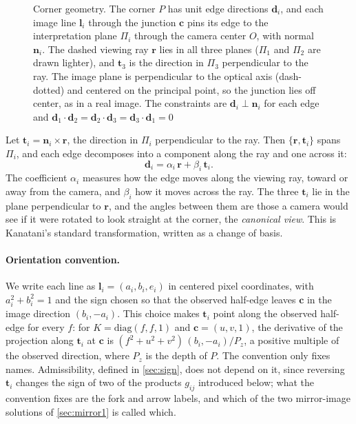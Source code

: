 \documentclass[pdflatex,sn-mathphys-num,iicol]{sn-jnl}
\newcommand{\vd}{\mathbf{d}}
\newcommand{\vr}{\mathbf{r}}
\newcommand{\vt}{\mathbf{t}}
\newcommand{\vn}{\mathbf{n}}
\newcommand{\vl}{\mathbf{l}}
\newcommand{\vc}{\mathbf{c}}
\theoremstyle{thmstyleone}
\theoremstyle{thmstylethree}
\theoremstyle{thmstyletwo}
\begin{document}
\begin{figure}[t]
\centering

\caption{Corner geometry. The corner $P$ has unit edge directions $\vd_i$, and each image line $\vl_i$ through the junction $\vc$ pins its edge to the interpretation plane $\Pi_i$ through the camera center $O$, with normal $\vn_i$. The dashed viewing ray $\vr$ lies in all three planes ($\Pi_1$ and $\Pi_2$ are drawn lighter), and $\vt_3$ is the direction in $\Pi_3$ perpendicular to the ray. The image plane is perpendicular to the optical axis (dash-dotted) and centered on the principal point, so the junction lies off center, as in a real image. The constraints are $\vd_i\perp\vn_i$ for each edge and $\vd_1\cdot\vd_2=\vd_2\cdot\vd_3=\vd_3\cdot\vd_1=0$}
\label{fig:geometry}
\end{figure}

Let $\vt_i=\vn_i\times\vr$, the direction in $\Pi_i$ perpendicular to the ray. Then $\{\vr,\vt_i\}$ spans $\Pi_i$, and each edge decomposes into a component along the ray and one across it:
\begin{equation}
\vd_i=\alpha_i\,\vr+\beta_i\,\vt_i .
\end{equation}
The coefficient $\alpha_i$ measures how the edge moves along the viewing ray, toward or away from the camera, and $\beta_i$ how it moves across the ray. The three $\vt_i$ lie in the plane perpendicular to $\vr$, and the angles between them are those a camera would see if it were rotated to look straight at the corner, the \emph{canonical view}. This is Kanatani's standard transformation, written as a change of basis.

\paragraph{Orientation convention.} We write each line as $\vl_i=(a_i,b_i,e_i)$ in centered pixel coordinates, with $a_i^2+b_i^2=1$ and the sign chosen so that the observed half-edge leaves $\vc$ in the image direction $(b_i,-a_i)$. This choice makes $\vt_i$ point along the observed half-edge for every $f$: for $K=\mathrm{diag}(f,f,1)$ and $\vc=(u,v,1)$, the derivative of the projection along $\vt_i$ at $\vc$ is $(f^2+u^2+v^2)\,(b_i,-a_i)/P_z$, a positive multiple of the observed direction, where $P_z$ is the depth of $P$. The convention only fixes names. Admissibility, defined in \cref{sec:sign}, does not depend on it, since reversing $\vt_i$ changes the sign of two of the products $g_{ij}$ introduced below; what the convention fixes are the fork and arrow labels, and which of the two mirror-image solutions of \cref{sec:mirror1} is called which.
\end{document}
